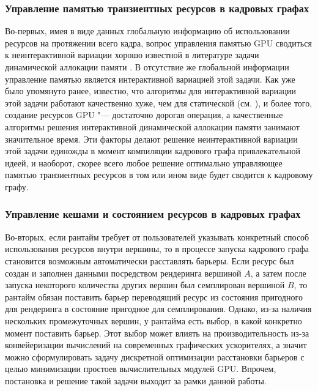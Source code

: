 \subsubsection{Управление памятью транзиентных ресурсов в кадровых графах}
Во-первых, имея в виде данных глобальную информацию об использовании ресурсов на протяжении всего кадра, вопрос управления памятью GPU сводиться к неинтерактивной вариации хорошо известной в литературе задачи динамической аллокации памяти \cite[с. 226]{10.5555/574848}.
В отсутствие же глобальной информации управление памятью является интерактивной вариацией этой задачи.
Как уже было упомянуто ранее, известно, что алгоритмы для интерактивной вариации этой задачи работают качественно хуже, чем для статической (см. \cite{robson1971estimate}), и более того, создание ресурсов GPU "--- достаточно дорогая операция, а качественные алгоритмы решения интерактивной динамической аллокации памяти занимают значительное время.
Эти факторы делают решение неинтерактивной вариации этой задачи единожды в момент компиляции кадрового графа привлекательной идеей, и наоборот, скорее всего любое решение оптимально управляющее памятью транзиентных ресурсов в том или ином виде будет сводится к кадровому графу.

\subsubsection{Управление кешами и состоянием ресурсов в кадровых графах}
Во-вторых, если рантайм требует от пользователей указывать конкретный способ использования ресурсов внутри вершины, то в процессе запуска кадрового графа становится возможным автоматически расставлять барьеры.
Если ресурс был создан и заполнен данными посредством рендеринга вершиной $A$, а затем после запуска некоторого количества других вершин был семплирован вершиной $B$, то рантайм обязан поставить барьер переводящий ресурс из состояния пригодного для рендеринга в состояние пригодное для семплирования.
Однако, из-за наличия нескольких промежуточных вершин, у рантайма есть выбор, в какой конкретно момент поставить барьер.
Этот выбор может влиять на производительность из-за конвейеризации вычислений на современных графических ускорителях, а значит можно сформулировать задачу дискретной оптимизации расстановки барьеров с целью минимизации простоев вычислительных модулей GPU.
Впрочем, постановка и решение такой задачи выходит за рамки данной работы.

